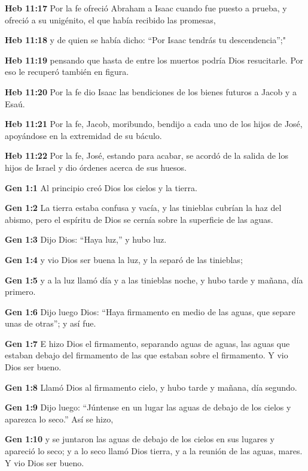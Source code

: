 \textbf{Heb 11:17} Por la fe ofreció Abraham a Isaac cuando fue puesto a prueba, y ofreció a su unigénito, el que había recibido las promesas, 

\textbf{Heb 11:18} y de quien se había dicho: “Por Isaac tendrás tu descendencia”;" 

\textbf{Heb 11:19} pensando que hasta de entre los muertos podría Dios resucitarle. Por eso le recuperó también en figura. 

\textbf{Heb 11:20} Por la fe dio Isaac las bendiciones de los bienes futuros a Jacob y a Esaú. 

\textbf{Heb 11:21} Por la fe, Jacob, moribundo, bendijo a cada uno de los hijos de José, apoyándose en la extremidad de su báculo. 

\textbf{Heb 11:22} Por la fe, José, estando para acabar, se acordó de la salida de los hijos de Israel y dio órdenes acerca de sus huesos. 




\textbf{Gen 1:1} Al principio creó Dios los cielos y la tierra. 

\textbf{Gen 1:2} La tierra estaba confusa y vacía, y las tinieblas cubrían la haz del abismo, pero el espíritu de Dios se cernía sobre la superficie de las aguas. 

\textbf{Gen 1:3} Dijo Dios: “Haya luz,” y hubo luz. 

\textbf{Gen 1:4} y vio Dios ser buena la luz, y la separó de las tinieblas; 

\textbf{Gen 1:5} y a la luz llamó día y a las tinieblas noche, y hubo tarde y mañana, día primero. 

\textbf{Gen 1:6} Dijo luego Dios: “Haya firmamento en medio de las aguas, que separe unas de otras”; y así fue. 

\textbf{Gen 1:7} E hizo Dios el firmamento, separando aguas de aguas, las aguas que estaban debajo del firmamento de las que estaban sobre el firmamento. Y vio Dios ser bueno. 

\textbf{Gen 1:8} Llamó Dios al firmamento cielo, y hubo tarde y mañana, día segundo. 

\textbf{Gen 1:9} Dijo luego: “Júntense en un lugar las aguas de debajo de los cielos y aparezca lo seco.” Así se hizo, 

\textbf{Gen 1:10} y se juntaron las aguas de debajo de los cielos en sus lugares y apareció lo seco; y a lo seco llamó Dios tierra, y a la reunión de las aguas, mares. Y vio Dios ser bueno. 

